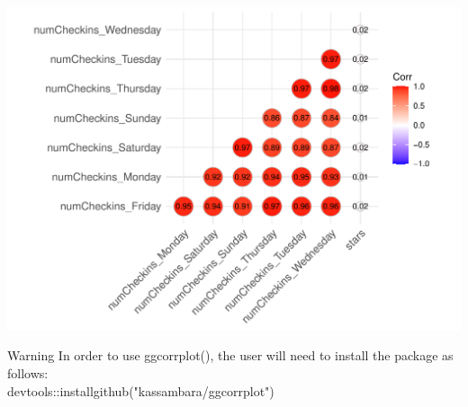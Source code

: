 \documentclass[12pt]{book}\usepackage{knitr}
\begin{document}
\begin{knitrout}
\begin{kframe}
\begin{alltt}
 \hlkwb{<-} \hlstd{(trainingSet)[}\hlopt{:}\hlstd{]}
 \hlkwb{<-} \hlstd{)}
\hlstd{(}
             \hlstd{=} \hlstd{,}
            \hlstd{=}\hlstd{,} \hlstd{=} \hlstd{,}
            \hlstd{=} \hlstd{)}
\end{alltt}
\end{kframe}
\includegraphics[width=\maxwidth]{figure/unnamed-chunk-42-1} 

\end{knitrout}



\begin{DIY}{Warning}
\noindent In order to use ggcorrplot(), the user will need to install the package as follows:\\
\noindent devtools::install\textunderscore github("kassambara/ggcorrplot")
\end{DIY}
\end{document}
